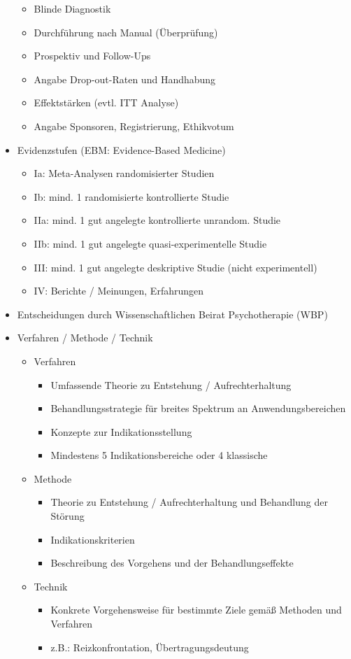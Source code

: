 \documentclass[11pt, paper=a4, twocolumn]{scrartcl}
\begin{document}
\begin{itemize}
\begin{itemize}
					\item Blinde Diagnostik
					\item Durchführung nach Manual (Überprüfung)
					\item Prospektiv und Follow-Ups
					\item Angabe Drop-out-Raten und Handhabung
					\item Effektstärken (evtl. ITT Analyse)
					\item Angabe Sponsoren, Registrierung, Ethikvotum
				\end{itemize}
			\item Evidenzstufen (EBM: Evidence-Based Medicine)
				\begin{itemize}
					\item Ia: Meta-Analysen randomisierter Studien
					\item Ib: mind. 1 randomisierte kontrollierte Studie
					\item IIa: mind. 1 gut angelegte kontrollierte unrandom. Studie
					\item IIb: mind. 1 gut angelegte quasi-experimentelle Studie
					\item III: mind. 1 gut angelegte deskriptive Studie (nicht experimentell)
					\item IV: Berichte / Meinungen, Erfahrungen
				\end{itemize}
			\item Entscheidungen durch Wissenschaftlichen Beirat Psychotherapie (WBP)
			\item Verfahren / Methode / Technik 
				\begin{itemize}
					\item Verfahren
						\begin{itemize}
							\item Umfassende Theorie zu Entstehung / Aufrechterhaltung
							\item Behandlungsstrategie für breites Spektrum an Anwendungsbereichen
							\item Konzepte zur Indikationsstellung
							\item Mindestens 5 Indikationsbereiche oder 4 klassische
						\end{itemize}
					\item Methode
						\begin{itemize}
							\item Theorie zu Entstehung / Aufrechterhaltung und Behandlung der Störung
							\item Indikationskriterien
							\item Beschreibung des Vorgehens und der Behandlungseffekte
						\end{itemize}
					\item Technik
						\begin{itemize}
							\item Konkrete Vorgehensweise für bestimmte Ziele gemäß Methoden und Verfahren
							\item z.B.: Reizkonfrontation, Übertragungsdeutung
						\end{itemize}
				\end{itemize}
		\end{itemize}
\end{document}
